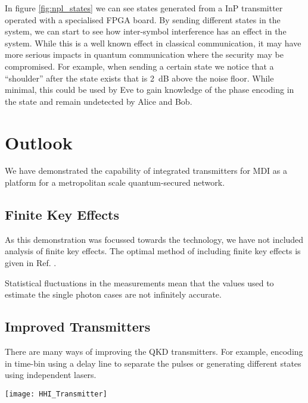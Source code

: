 In figure \ref{fig:npl_states} we can see states generated from a \ac{InP} transmitter operated with a specialised FPGA board. By sending different states in the system, we can start to see how inter-symbol interference has an effect in the system. While this is a well known effect in classical communication, it may have more serious impacts in quantum communication where the security may be compromised. For example, when sending a certain state we notice that a ``shoulder'' after the state exists that is \SI{2}{dB} above the noise floor. While minimal, this could be used by Eve to gain knowledge of the phase encoding in the state and remain undetected by Alice and Bob.

\section{Outlook}

We have demonstrated the capability of integrated transmitters for \acl{MDI} as a platform for a metropolitan scale quantum-secured network. 

\subsection{Finite Key Effects}

As this demonstration was focussed towards the technology, we have not included analysis of finite key effects. The optimal method of including finite key effects is given in Ref. \cite{zhou2016}.

Statistical fluctuations in the measurements mean that the values used to estimate the single photon cases are not infinitely accurate. 

\subsection{Improved Transmitters}

There are many ways of improving the QKD transmitters. For example, encoding in time-bin using a delay line to separate the pulses or generating different states using independent lasers.

\begin{sidewaysfigure}
	\centering
	\texttt{[image: HHI\_Transmitter]}
	\caption[Latest generation InP QKD Transmitter]{Latest generation HHI indium phosphide transmitter. The \SI[product-units=power]{6x4}{mm} chip contains a few ways to create BB84 states for QKD. Firstly, we have designs to compare \ac{dfb} and \ac{DBR} lasers. Secondly, we can use a delay line to separate the time bins. Finally, we have multiplexed lasers to pulse independently lasers for each state.}
\end{sidewaysfigure}

